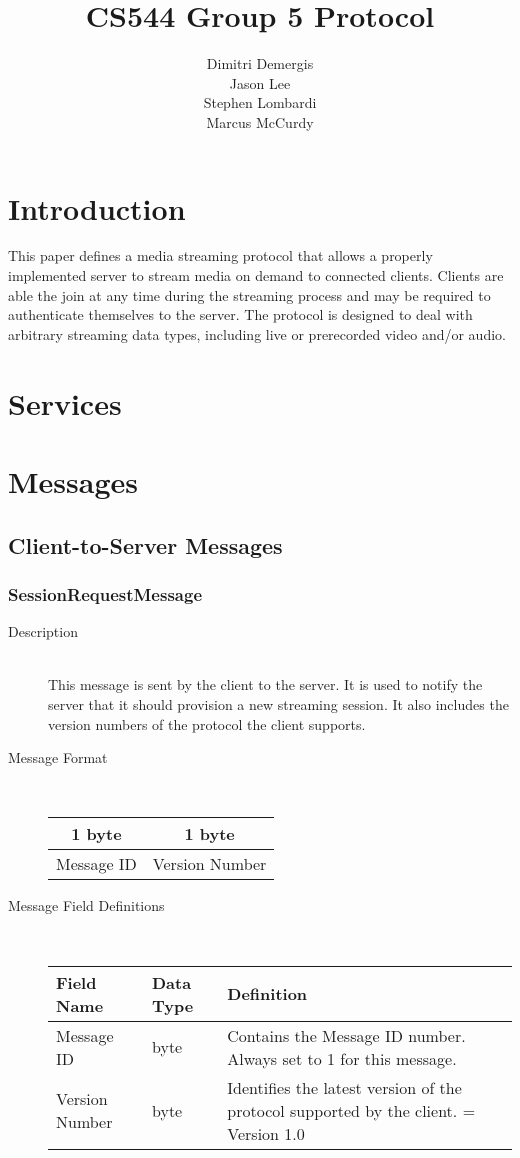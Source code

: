 \documentclass[12pt,letterpaper,titlepage]{article}
\author{Dimitri Demergis \\ Jason Lee \\ Stephen Lombardi \\ Marcus McCurdy}
\title{CS544 Group 5 Protocol}
\begin{document}
\maketitle

\section{Introduction}
This paper defines a media streaming protocol that allows a properly implemented server to stream media on demand to connected clients. Clients are able the join at any time during the streaming process and may be required to authenticate themselves to the server. The protocol is designed to deal with arbitrary streaming data types, including live or prerecorded video and/or audio.
\section{Services}

\section{Messages}
\subsection{Client-to-Server Messages}
\subsubsection{SessionRequestMessage}
	\begin{description}
	\item[Description] \hfill \\
		This message is sent by the client to the server.  It is used to notify the server that it 
		should provision a new streaming session. It also includes the version numbers of the 
		protocol the client supports.
	\item[Message Format] \hfill \\
	\begin{tabular}{ | c | c | }
		\hline
		1 byte & 1 byte \\
		\hline
		Message ID &  Version Number \\
		\hline
	\end{tabular}
	\item[Message Field Definitions] \hfill \\
	\begin{tabular}{ | p{3cm} | p{1cm} | p{8cm} | }
		\hline
		Field Name & Data Type & Definition \\
		\hline
		Message ID & byte & Contains the Message ID number. \newline Always set to 1 for this message. \\
		\hline
		Version Number & byte & Identifies the latest version of the protocol supported by the client.
						\newline 1 = Version 1.0 \\
		\hline
	\end{tabular}
	\end{description}
\end{document}

